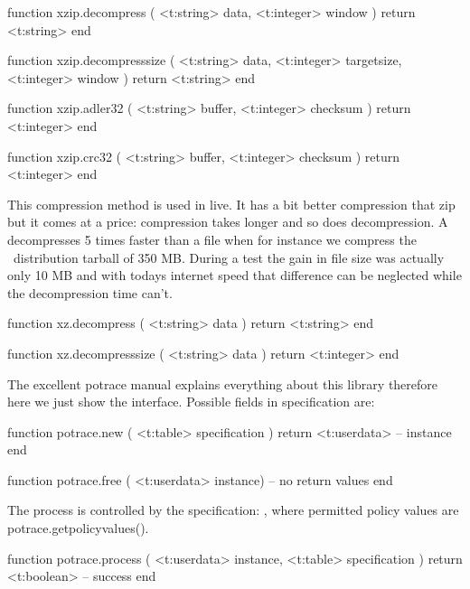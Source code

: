 function xzip.decompress (
    <t:string>  data,
    <t:integer> window
)
    return <t:string>
end

function xzip.decompresssize (
    <t:string>  data,
    <t:integer> targetsize,
    <t:integer> window
)
    return <t:string>
end

function xzip.adler32 (
    <t:string>  buffer,
    <t:integer> checksum
)
    return <t:integer>
end

function xzip.crc32 (
    <t:string>  buffer,
    <t:integer> checksum
)
    return <t:integer>
end
\stoptyping

\stopsubsection

\startsubsection[title=XZ]

This compression method is used in \TEX live. It has a bit better compression
that zip but it comes at a price: compression takes longer and so does
decompression. A  decompresses 5 times faster than a  file
when for instance we compress the \CONTEXT\ distribution tarball of 350 MB.
During a test the gain in file size was actually only 10 MB and with todays
internet speed that difference can be neglected while the decompression time
can't.

\starttyping[option=LUA]
function xz.decompress (
    <t:string> data
)
    return <t:string>
end

function xz.decompresssize (
    <t:string> data
)
    return <t:integer>
end
\stoptyping

\stopsubsection

\startsubsection[title=Potrace]

The excellent potrace manual explains everything about this library therefore
here we just show the interface. Possible fields in specification are:

\starttyping[option=LUA]
function potrace.new ( <t:table> specification )
    return <t:userdata> -- instance
end
\stoptyping


\starttyping[option=LUA]
function potrace.free ( <t:userdata> instance)
    -- no return values
end
\stoptyping

The process is controlled by the specification: , where permitted policy values are \showenginekeylist
{potrace.getpolicyvalues()}.

\starttyping[option=LUA]
function potrace.process ( <t:userdata> instance, <t:table> specification )
    return <t:boolean> -- success
end
\stoptyping

